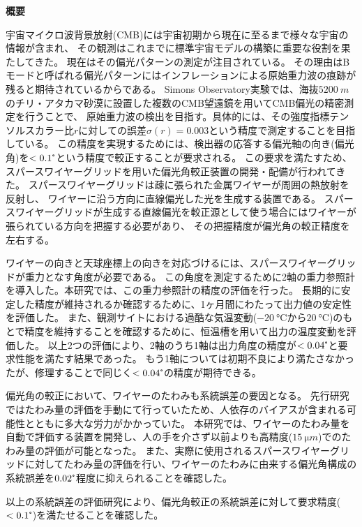 \documentclass[../../main.tex]{subfiles}
\begin{document}
\begin{center}
\Large\textbf{概要}
\end{center}
\indent 

宇宙マイクロ波背景放射(CMB)には宇宙初期から現在に至るまで様々な宇宙の情報が含まれ、
その観測はこれまでに標準宇宙モデルの構築に重要な役割を果たしてきた。
現在はその偏光パターンの測定が注目されている。
その理由はBモードと呼ばれる偏光パターンにはインフレーションによる原始重力波の痕跡が残ると期待されているからである。
Simons Observatory実験では、海抜$\SI{5200}{m}$のチリ・アタカマ砂漠に設置した複数のCMB望遠鏡を用いてCMB偏光の精密測定を行うことで、
原始重力波の検出を目指す。具体的には、その強度指標テンソルスカラー比$r$に対しての誤差$\sigma(r)=0.003$という精度で測定することを目指している。
この精度を実現するためには、検出器の応答する偏光軸の向き(偏光角)を$<0.1\tcdegree$という精度で較正することが要求される。
この要求を満たすため、スパースワイヤーグリッドを用いた偏光角較正装置の開発・配備が行われてきた。
スパースワイヤーグリッドは疎に張られた金属ワイヤーが周囲の熱放射を反射し、
ワイヤーに沿う方向に直線偏光した光を生成する装置である。
スパースワイヤーグリッドが生成する直線偏光を較正源として使う場合にはワイヤーが張られている方向を把握する必要があり、
その把握精度が偏光角の較正精度を左右する。

ワイヤーの向きと天球座標上の向きを対応づけるには、スパースワイヤーグリッドが重力となす角度が必要である。
この角度を測定するために2軸の重力参照計を導入した。本研究では、この重力参照計の精度の評価を行った。
長期的に安定した精度が維持されるか確認するために、1ヶ月間にわたって出力値の安定性を評価した。
また、観測サイトにおける過酷な気温変動($\SI{-20}{\degreeCelsius}$から$\SI{20}{\degreeCelsius}$)のもとで精度を維持することを確認するために、恒温槽を用いて出力の温度変動を評価した。
以上2つの評価により、2軸のうち1軸は出力角度の精度が$<0.04\tcdegree$と要求性能を満たす結果であった。
もう1軸については初期不良により満たさなかったが、修理することで同じく$<0.04\tcdegree$の精度が期待できる。

偏光角の較正において、ワイヤーのたわみも系統誤差の要因となる。
先行研究ではたわみ量の評価を手動にて行っていたため、人依存のバイアスが含まれる可能性とともに多大な労力がかかっていた。
本研究では、ワイヤーのたわみ量を自動で評価する装置を開発し、人の手を介さず以前よりも高精度($\SI{15}{\micro m}$)でのたわみ量の評価が可能となった。
また、実際に使用されるスパースワイヤーグリッドに対してたわみ量の評価を行い、ワイヤーのたわみに由来する偏光角構成の系統誤差を$0.02\tcdegree$程度に抑えられることを確認した。

以上の系統誤差の評価研究により、偏光角較正の系統誤差に対して要求精度($<0.1\tcdegree$)を満たせることを確認した。
\end{document}
